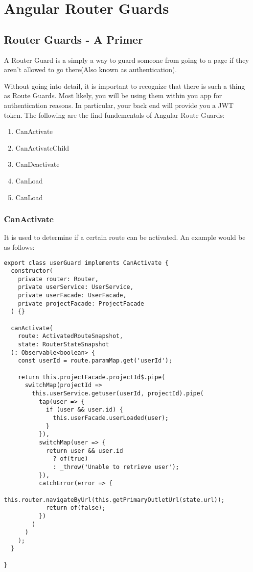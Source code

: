 \maketitle{}
\section{ Angular Router Guards }

\subsection{ Router Guards - A Primer }
A Router Guard is a simply a way to guard someone from going to a page if they
aren't allowed to go there(Also known as authentication).

Without going into detail, it is important to recognize that there is such a
thing as Route Guards. Most likely, you will be using them within you app
for authentication reasons. In particular, your back end will provide you a JWT
token. The following are the find fundementals of Angular Route Guards:
\begin{enumerate}
  \item CanActivate
  \item CanActivateChild
  \item CanDeactivate
  \item CanLoad
  \item CanLoad
\end{enumerate}

\subsubsection{ CanActivate }
It is used to determine if a certain route can be activated. An example would
be as follows:
\begin{lstlisting}
export class userGuard implements CanActivate {
  constructor(
    private router: Router,
    private userService: UserService,
    private userFacade: UserFacade,
    private projectFacade: ProjectFacade
  ) {}

  canActivate(
    route: ActivatedRouteSnapshot,
    state: RouterStateSnapshot
  ): Observable<boolean> {
    const userId = route.paramMap.get('userId');

    return this.projectFacade.projectId$.pipe(
      switchMap(projectId =>
        this.userService.getuser(userId, projectId).pipe(
          tap(user => {
            if (user && user.id) {
              this.userFacade.userLoaded(user);
            }
          }),
          switchMap(user => {
            return user && user.id
              ? of(true)
              : _throw('Unable to retrieve user');
          }),
          catchError(error => {
            this.router.navigateByUrl(this.getPrimaryOutletUrl(state.url));
            return of(false);
          })
        )
      )
    );
  }

}

\end{lstlisting}
